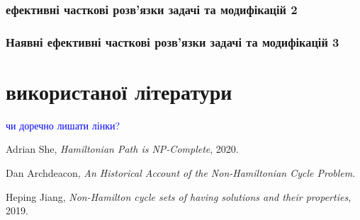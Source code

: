 \documentclass[14pt]{article}
\begin{document}
\begin{spacing}{1.175}
            \subsubsection{ ефективні часткові розв'язки задачі та модифікацій 2}
            \subsubsection{\normalfont Наявні ефективні часткові розв'язки задачі та модифікацій 3}
            
        

    \section{ використаної літератури}
    \textcolor{blue}{чи доречно лишати лінки?}
    \begin{thebibliography}{9}
        \item Adrian She, \emph{Hamiltonian Path is NP-Complete}, 2020.
        \item Dan Archdeacon, \emph{An Historical Account of the Non-Hamiltonian Cycle Problem}.
        \item Heping Jiang, \emph{Non-Hamilton cycle sets of having solutions and their properties}, 2019.
    \end{thebibliography}


    
	\end{spacing}
\end{document}
